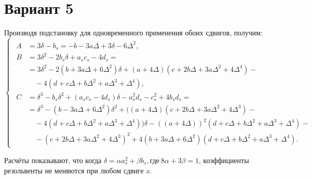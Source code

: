 \documentclass{article}
\begin{document}
\section*{Вариант 5}
Производя подстановку для одновременного применения обоих сдвигов, получим:
\begin{equation}
\begin{cases}
\begin{aligned}
A &= 3\delta - b_s = -b - 3a\Delta + 3\delta -6\Delta^2, \\
B &= 3\delta^2 -2b_s \delta + a_s c_s - 4d_s = \\ 
&= 3\delta^2-2(b + 3a\Delta + 6\Delta^2)\delta + (a + 4\Delta)(c + 2b\Delta + 3a\Delta^2 + 4\Delta^4) -\\ 
&\quad- 4(d + c\Delta + b\Delta^2 + a\Delta^3 + \Delta^4), \\
C &= \delta^3 - b_s \delta^2 + (a_s c_s - 4d_s)\delta -a_s^2 d_s - c_s^2 + 4b_sd_s = \\ 
&= \delta^3 - (b - 3a\Delta + 6\Delta^2)\delta^2 + ((a + 4\Delta)(c + 2b\Delta + 3a\Delta^2 + 4\Delta^3) - \\
&\quad- 4(d + c\Delta + b\Delta^2 + a\Delta^3 + \Delta^4))\delta - ((a + 4\Delta))^2(d + c\Delta +  b\Delta^2 + a\Delta^3 + \Delta^4) - \\ 
&\quad- (c + 2b\Delta + 3a\Delta^2 + 4\Delta^3)^2 + 4(b + 3a\Delta + 6\Delta^2)(d + c\Delta + b\Delta^2 + a\Delta^3 + \Delta^4).
\end{aligned}
\end{cases}
\end{equation}

Расчёты показывают, что когда $\delta = \alpha a_s^2 + \beta b_s, \text{где}~ 8\alpha + 3\beta = 1$, коэффициенты резольвенты не меняются при любом сдвиге \textit{x}.
\end{document}
